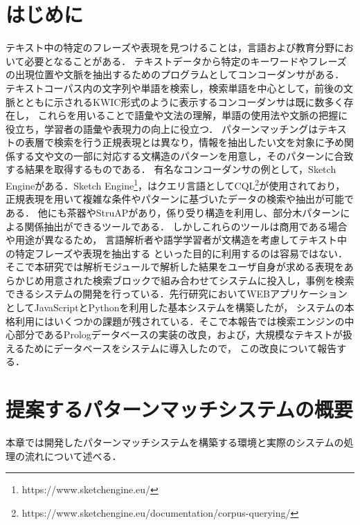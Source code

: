 \documentclass{FITpaper}
\begin{document}
\maketitle

\section{はじめに}
テキスト中の特定のフレーズや表現を見つけることは，言語および教育分野において必要となることがある．
テキストデータから特定のキーワードやフレーズの出現位置や文脈を抽出するためのプログラムとしてコンコーダンサがある．
テキストコーパス内の文字列や単語を検索し，検索単語を中心として，前後の文脈とともに示されるKWIC形式のように表示するコンコーダンサは既に数多く存在し\cite{WebParaNews:2014}\cite{corpusworkshop:2012}，
これらを用いることで語彙や文法の理解，単語の使用法や文脈の把握に役立ち，学習者の語彙や表現力の向上に役立つ．
パターンマッチングはテキストの表層で検索を行う正規表現とは異なり，情報を抽出したい文を対象に予め関係する文や文の一部に対応する文構造のパターンを用意し，そのパターンに合致する結果を取得するものである．
有名なコンコーダンサの例として，Sketch Engineがある．Sketch Engine\footnote{https://www.sketchengine.eu/}，はクエリ言語としてCQL\footnote{https://www.sketchengine.eu/documentation/corpus-querying/}が使用されており，正規表現を用いて複雑な条件やパターンに基づいたデータの検索や抽出が可能である．
他にも茶器\cite{matsu2010}やStruAP\cite{struAP:2017}があり，係り受り構造を利用し、部分木パターンによる関係抽出ができるツールである．
しかしこれらのツールは商用である場合や用途が異なるため，
言語解析者や語学学習者が文構造を考慮してテキスト中の特定フレーズや表現を抽出する%
といった目的に利用するのは容易ではない．そこで本研究では解析モジュールで解析した結果をユーザ自身が求める表現をあらかじめ用意された検索ブロックで組み合わせてシステムに投入し，事例を検索できるシステムの開発を行っている．先行研究\cite{okada2021}\cite{ogasawara2021}においてWEBアプリケーションとしてJavaScriptとPythonを利用した基本システムを構築したが，
システムの本格利用にはいくつかの課題が残されている．そこで本報告では検索エンジンの中心部分であるPrologデータベースの実装の改良，および，大規模なテキストが扱えるためにデータベースをシステムに導入したので，
この改良について報告する．


\section{提案するパターンマッチシステムの概要}
本章では開発したパターンマッチシステムを構築する環境と実際のシステムの処理の流れについて述べる．
\end{document}
